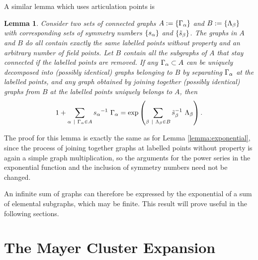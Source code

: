 \documentclass[8.5pt,twoside,twocolumn]{article}
\theoremstyle{standard}
\newtheorem{lem}[theo]{Lemma}
\begin{document}
A similar lemma which uses articulation points is
\begin{lem}
\label{lemma:articulation}
Consider two sets of connected graphs $A:=\left\{{\Gamma_{\alpha}} \right\}$ and $B:=\left\{{\Lambda_{\beta}} \right\}$
with corresponding sets of symmetry numbers $\left\{{s_{\alpha}} \right\}$ and $\left\{{\tilde s_{\beta}} \right\}$. The graphs in $A$ and $B$
do all contain exactly the same labelled points without property and an
arbitrary number of field points. Let $B$ contain all the subgraphs of $A$ that stay connected if the labelled
points are removed. If any $\Gamma_{\alpha} \subset A$ can be uniquely decomposed into
(possibly identical) graphs belonging to $B$ by separating $\Gamma_{\alpha}$ at the labelled points, and any graph obtained by joining together
(possibly identical) graphs from $B$ at the labelled points uniquely belongs to $A$, then
\begin{equation}
1 + \sum_{\alpha\ |\ \Gamma_{\alpha} \in A} {s_{\alpha}}^{-1}\ \Gamma_{\alpha} = \exp\left(\sum_{\beta\ |\ \Lambda_{\beta} \in B} {\tilde s_{\beta}}^{-1}\ \Lambda_{\beta} \right).
\label{Lemma6:eq}
\end{equation}
\end{lem}
The proof for this lemma is exactly the same as for Lemma \ref{lemma:exponential}, since the process of
joining together graphs at labelled points without property is again a simple graph multiplication,
so the arguments for the power series in the exponential function and the inclusion of symmetry
numbers need not be changed.  

An infinite sum of graphs can therefore be expressed by the exponential of a sum of elemental
subgraphs, which may be finite. This result will prove useful in the following sections.

\section{The Mayer Cluster Expansion}
\label{MCE}
\end{document}
